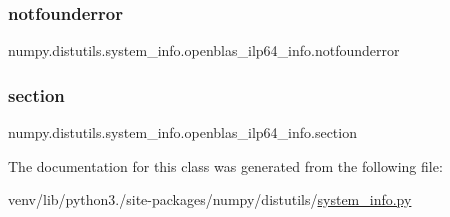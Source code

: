 \subsubsection{\texorpdfstring{notfounderror}{notfounderror}}
{\footnotesize\ttfamily numpy.\+distutils.\+system\+\_\+info.\+openblas\+\_\+ilp64\+\_\+info.\+notfounderror\hspace{0.3cm}{\ttfamily [static]}}

\mbox{\label{classnumpy_1_1distutils_1_1system__info_1_1openblas__ilp64__info_aa7e3da20746cd84ed99d968265d8664c}} 
\subsubsection{\texorpdfstring{section}{section}}
{\footnotesize\ttfamily numpy.\+distutils.\+system\+\_\+info.\+openblas\+\_\+ilp64\+\_\+info.\+section\hspace{0.3cm}{\ttfamily [static]}}



The documentation for this class was generated from the following file\+:\begin{DoxyCompactItemize}
\item 
venv/lib/python3./site-\/packages/numpy/distutils/\hyperlink{system__info_8py}{system\+\_\+info.\+py}\end{DoxyCompactItemize}
